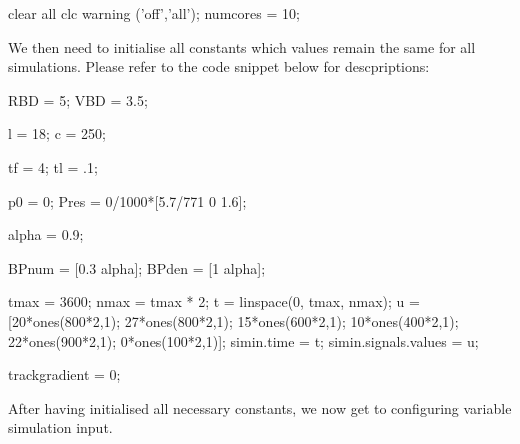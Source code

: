\begin{python}
clear all
clc
warning ('off','all');
numcores = 10;
\end{python}

\par\noindent
We then need to initialise all constants which values remain the same for all simulations. Please refer to the code snippet below for descpriptions:

\bigskip\noindent{}

\begin{matlab}

RBD = 5; %
VBD = 3.5; %

l = 18; %
c = 250; %

tf = 4; %
tl = .1; 

p0 = 0; %
Pres = 0/1000*[5.7/771 0 1.6]; %

alpha = 0.9; 

BPnum = [0.3 alpha]; 
BPden = [1 alpha]; 

tmax = 3600; %
nmax = tmax * 2; %
t = linspace(0, tmax, nmax); %
u = [20*ones(800*2,1); 27*ones(800*2,1); 15*ones(600*2,1); 10*ones(400*2,1); 
	22*ones(900*2,1); 0*ones(100*2,1)]; %
simin.time = t; %
simin.signals.values = u; %

trackgradient = 0; %
\end{matlab}

\par\noindent
After having initialised all necessary constants, we now get to configuring variable simulation input.


